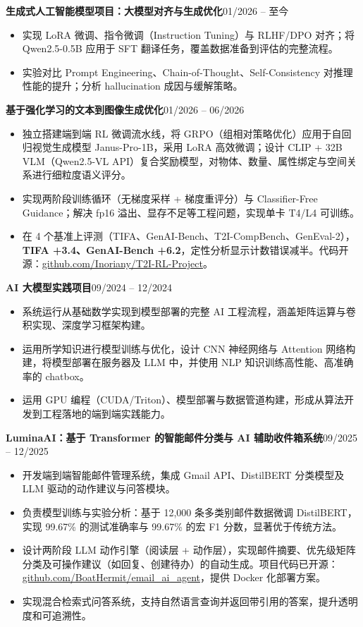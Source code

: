\documentclass[a4paper,10pt]{article}
\newcommand{\entry}[2]{%
  \noindent\textbf{#1}\hfill#2\par%
}
\begin{document}
\vspace{5pt}
\entry{生成式人工智能模型项目：大模型对齐与生成优化}{01/2026 -- 至今}
\begin{itemize}
  \item 实现 LoRA 微调、指令微调（Instruction Tuning）与 RLHF/DPO 对齐；将 Qwen2.5-0.5B 应用于 SFT 翻译任务，覆盖数据准备到评估的完整流程。
  \item 实验对比 Prompt Engineering、Chain-of-Thought、Self-Consistency 对推理性能的提升；分析 hallucination 成因与缓解策略。
\end{itemize}

\vspace{5pt}
\entry{基于强化学习的文本到图像生成优化}{01/2026 -- 06/2026}
\begin{itemize}
  \item 独立搭建端到端 RL 微调流水线，将 GRPO（组相对策略优化）应用于自回归视觉生成模型 Janus-Pro-1B，采用 LoRA 高效微调；设计 CLIP + 32B VLM（Qwen2.5-VL API）复合奖励模型，对物体、数量、属性绑定与空间关系进行细粒度语义评分。
  \item 实现两阶段训练循环（无梯度采样 + 梯度重评分）与 Classifier-Free Guidance；解决 fp16 溢出、显存不足等工程问题，实现单卡 T4/L4 可训练。
  \item 在 4 个基准上评测（TIFA、GenAI-Bench、T2I-CompBench、GenEval-2），\textbf{TIFA +3.4、GenAI-Bench +6.2}，定性分析显示计数错误减半。代码开源：\href{https://github.com/Inoriany/T2I-RL-Project}{github.com/Inoriany/T2I-RL-Project}。
\end{itemize}

\vspace{5pt}
\entry{AI 大模型实践项目}{09/2024 -- 12/2024}
\begin{itemize}
  \item 系统运行从基础数学实现到模型部署的完整 AI 工程流程，涵盖矩阵运算与卷积实现、深度学习框架构建。
  \item 运用所学知识进行模型训练与优化，设计 CNN 神经网络与 Attention 网络构建，将模型部署在服务器及 LLM 中，并使用 NLP 知识训练高性能、高准确率的 chatbox。
  \item 运用 GPU 编程（CUDA/Triton）、模型部署与数据管道构建，形成从算法开发到工程落地的端到端实践能力。
\end{itemize}

\vspace{5pt}
\entry{LuminaAI：基于 Transformer 的智能邮件分类与 AI 辅助收件箱系统}{09/2025 -- 12/2025}
\begin{itemize}
  \item 开发端到端智能邮件管理系统，集成 Gmail API、DistilBERT 分类模型及 LLM 驱动的动作建议与问答模块。
  \item 负责模型训练与实验分析：基于 12,000 条多类别邮件数据微调 DistilBERT，实现 99.67\% 的测试准确率与 99.67\% 的宏 F1 分数，显著优于传统方法。
  \item 设计两阶段 LLM 动作引擎（阅读层 + 动作层），实现邮件摘要、优先级矩阵分类及可操作建议（如回复、创建待办）的自动生成。项目代码已开源：\href{https://github.com/BoatHermit/email_ai_agent}{github.com/BoatHermit/email\_ai\_agent}，提供 Docker 化部署方案。
  \item 实现混合检索式问答系统，支持自然语言查询并返回带引用的答案，提升透明度和可追溯性。
\end{itemize}
\end{document}
